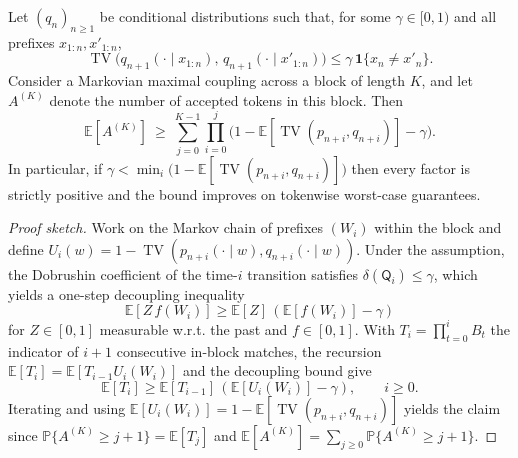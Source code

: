 \begin{theorem}\label{thm:markov-block-gain}\sloppy
Let $(q_n)_{n\ge1}$ be conditional distributions such that, for some $\gamma\in[0,1)$ and all prefixes $x_{1:n},x'_{1:n}$,
\[
\operatorname{TV}\big(q_{n+1}(\cdot\mid x_{1:n}),\,q_{n+1}(\cdot\mid x'_{1:n})\big)\le \gamma\,\mathbf{1}\{x_n\ne x'_n\}.
\]
Consider a Markovian maximal coupling across a block of length $K$, and let $A^{(K)}$ denote the number of accepted tokens in this block. Then
\[
\mathbb{E}[A^{(K)}]\ \ge\ \sum_{j=0}^{K-1}\prod_{i=0}^{j}\Big(1-\mathbb{E}[\operatorname{TV}(p_{n+i},q_{n+i})]-\gamma\Big).
\]
In particular, if $\gamma<\min_i\big(1-\mathbb{E}[\operatorname{TV}(p_{n+i},q_{n+i})]\big)$ then every factor is strictly positive and the bound improves on tokenwise worst-case guarantees.
\end{theorem}

\begin{proof}[Proof sketch]
Work on the Markov chain of prefixes $(W_i)$ within the block and define $U_i(w)=1-\operatorname{TV}(p_{n+i}(\cdot\mid w),q_{n+i}(\cdot\mid w))$. Under the assumption, the Dobrushin coefficient of the time-$i$ transition satisfies $\delta(\mathsf Q_i)\le\gamma$, which yields a one-step decoupling inequality
\[
\mathbb E[Z\,f(W_i)]\ge \mathbb E[Z]\,(\mathbb E[f(W_i)]-\gamma)
\]
for $Z\in[0,1]$ measurable w.r.t. the past and $f\in[0,1]$. With $T_i=\prod_{t=0}^i B_t$ the indicator of $i{+}1$ consecutive in-block matches, the recursion $\mathbb E[T_i]=\mathbb E[T_{i-1}U_i(W_i)]$ and the decoupling bound give
\[
\mathbb E[T_i]\ge \mathbb E[T_{i-1}]\,(\mathbb E[U_i(W_i)]-\gamma),\qquad i\ge0.
\]
Iterating and using $\mathbb E[U_i(W_i)]=1-\mathbb E[\operatorname{TV}(p_{n+i},q_{n+i})]$ yields the claim since $\mathbb P\{A^{(K)}\ge j{+}1\}=\mathbb E[T_j]$ and $\mathbb E[A^{(K)}]=\sum_{j\ge0}\mathbb P\{A^{(K)}\ge j{+}1\}$.\qedhere
\end{proof}

